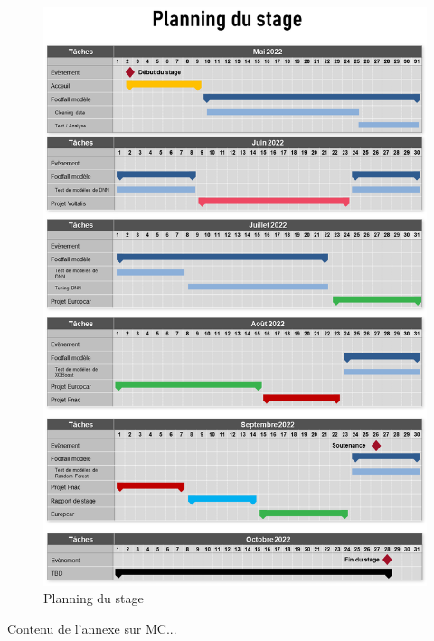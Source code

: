 \documentclass{themeensg}
\begin{document}
\newevenpage
\printbibliography[title={Bibliographie}]
\nocite{*}

\newevenpage
\listoffigures

\newevenpage
\listoftables

\begin{appendices} 
\label{beginappendices}
\label{planning_gannt}

\begin{figure}[H]
  \centering
  \includegraphics[width=13cm]{images/graphs/gannt.png}
  \caption{Planning du stage}
\end{figure}

\label{annexemc}
Contenu de l'annexe sur MC...

\end{appendices} 
\end{document}
